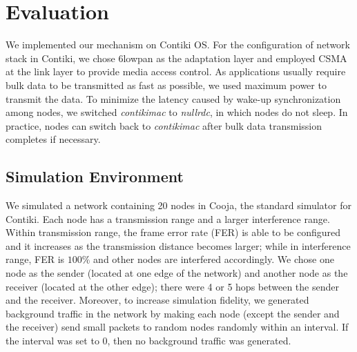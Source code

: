 \documentclass[runningheads,a4paper]{llncs}
\begin{document}
\section{Evaluation}
We implemented our mechanism on Contiki OS. For the configuration of network stack in Contiki, we chose 6lowpan as the adaptation layer and employed CSMA at the link layer to provide media access control. As applications usually require bulk data to be transmitted as fast as possible, we used maximum power to transmit the data. To minimize the latency caused by wake-up synchronization among nodes, we switched \textit{contikimac} to \textit{nullrdc}, in which nodes do not sleep. In practice, nodes can switch back to \textit{contikimac} after bulk data transmission completes if necessary.

\subsection{Simulation Environment}
We simulated a network containing 20 nodes in Cooja, the standard simulator for Contiki. Each node has a transmission range and a larger interference range. Within transmission range, the frame error rate (FER) is able to be configured and it increases as the transmission distance becomes larger; while in interference range, FER is $100\%$ and other nodes are interfered accordingly. We chose one node as the sender (located at one edge of the network) and another node as the receiver (located at the other edge); there were 4 or 5 hops between the sender and the receiver. Moreover, to increase simulation fidelity, we generated background traffic in the network by making each node (except the sender and the receiver) send small packets to random nodes randomly within an interval. If the interval was set to 0, then no background traffic was generated.
\end{document}
